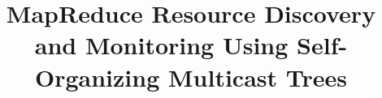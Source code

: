 \documentclass{acm_proc_article-sp}
\begin{document}
\title{MapReduce Resource Discovery and Monitoring Using Self-Organizing Multicast Trees}
%
%
%
%
%
\end{document}
